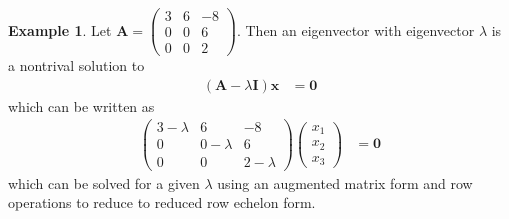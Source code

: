 \documentclass[
]{book}
\theoremstyle{definition}
\theoremstyle{definition}
\newtheorem{example}{Example}[chapter]
\theoremstyle{definition}
\theoremstyle{definition}
\theoremstyle{remark}
\begin{document}
\begin{example}
Let \(\mathbf{A} = \begin{pmatrix} 3 & 6 & -8 \\ 0 & 0 & 6 \\ 0 & 0 & 2 \end{pmatrix}\). Then an eigenvector with eigenvector \(\lambda\) is a nontrival solution to
\[
\begin{aligned}
\left( \mathbf{A} - \lambda \mathbf{I} \right) \mathbf{x} & = \mathbf{0}
\end{aligned}
\]
which can be written as
\[
\begin{aligned}
\begin{pmatrix} 
3  - \lambda & 6 & -8 \\
0 & 0 - \lambda & 6 \\
0 & 0 & 2 - \lambda
\end{pmatrix} \begin{pmatrix} x_1 \\ x_2 \\ x_3 \end{pmatrix} & = \mathbf{0}
\end{aligned}
\]
which can be solved for a given \(\lambda\) using an augmented matrix form and row operations to reduce to reduced row echelon form.


\end{example}
\end{document}
